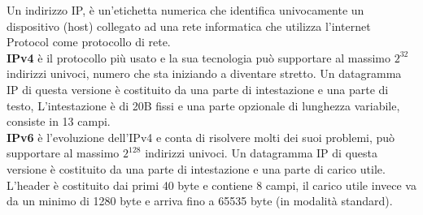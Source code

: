 Un indirizzo IP, è un’etichetta numerica che identifica univocamente un dispositivo (host) collegato ad una rete informatica che utilizza l’internet Protocol come protocollo di rete.\\
\textbf{IPv4} è il protocollo più usato e la sua tecnologia può supportare al massimo $2^32$ indirizzi univoci, numero che sta iniziando a diventare stretto.
Un datagramma IP di questa versione è costituito da una parte di intestazione e una parte di testo, L’intestazione è di 20B fissi e una parte opzionale di lunghezza variabile, consiste in 13 campi.\\
\textbf{IPv6} è l’evoluzione dell’IPv4 e conta di risolvere molti dei suoi problemi, può supportare al massimo $2^128$ indirizzi univoci.
Un datagramma IP di questa versione è costituito da una parte di intestazione e una parte di carico utile. L’header è costituito dai primi 40 byte e contiene 8 campi, il carico utile invece va da un minimo di 1280 byte e arriva fino a 65535 byte (in modalità standard).

